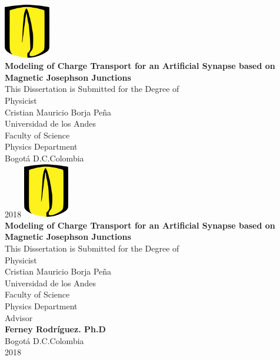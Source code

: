 \documentclass[12pt]{article}
\begin{document}
\begin{center}

\includegraphics[width=2cm]{logo.png}\\

\vspace{2cm}
\textbf{{\LARGE Modeling of Charge Transport for an Artificial Synapse based on Magnetic Josephson Junctions }}\\
\vspace{2.5cm}
{\LARGE{This Dissertation is Submitted for the Degree of}}\\
\vspace{1.0cm}
\centering
{\LARGE{Physicist}}\\
\vspace{2.0cm}
{\large Cristian Mauricio Borja Peña}\\
\vspace{2.5cm}
Universidad de los Andes\\
Faculty of Science\\
Physics Department\\
\vspace{2.5cm}
Bogotá D.C.\hspace{0.1cm}Colombia\\
2018
\newpage
\thispagestyle{empty}
\includegraphics[width=2cm]{logo.png}\\
\vspace{2cm}
\textbf{{\LARGE Modeling of Charge Transport for an Artificial Synapse based on Magnetic Josephson Junctions}}\\
\vspace{1.5cm}
{\LARGE{This Dissertation is Submitted for the Degree of}}\\
\vspace{1.0cm}
\centering
{\LARGE{Physicist}}\\
\vspace{2.0cm}
{\large Cristian Mauricio Borja Peña}\\
\vspace{2.5cm}
Universidad de los Andes\\
Faculty of Science\\
Physics Department\\
\vspace{1.5cm}
Advisor\\
\textbf{\large{Ferney Rodríguez. Ph.D}}\\
\vspace{0.5cm}
Bogotá D.C.\hspace{0.1cm}Colombia\\
2018
\end{center}
\end{document}
